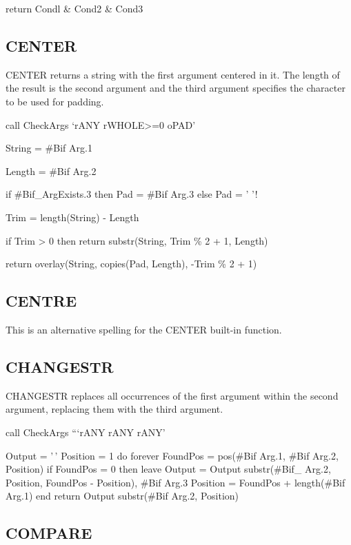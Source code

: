 return Condl \& Cond2 \& Cond3

\hypertarget{center}{%
\subsection{CENTER}\label{center}}

CENTER returns a string with the first argument centered in it. The
length of the result is the second argument and the third argument
specifies the character to be used for padding.

call CheckArgs `rANY rWHOLE\textgreater=0 oPAD'

String = \#Bif Arg.1

Length = \#Bif Arg.2

if \#Bif\_ArgExists.3 then Pad = \#Bif Arg.3 else Pad = ' '!

Trim = length(String) - Length

if Trim \textgreater{} 0 then return substr(String, Trim \% 2 + 1,
Length)

return overlay(String, copies(Pad, Length), -Trim \% 2 + 1)

\hypertarget{centre}{%
\subsection{CENTRE}\label{centre}}

This is an alternative spelling for the CENTER built-in function.

\hypertarget{changestr}{%
\subsection{CHANGESTR}\label{changestr}}

CHANGESTR replaces all occurrences of the first argument within the
second argument, replacing them with the third argument.

call CheckArgs ```rANY rANY rANY'

Output = '\,' Position = 1 do forever FoundPos = pos(\#Bif Arg.1, \#Bif
Arg.2, Position) if FoundPos = 0 then leave Output = Output
\textbar\textbar{} substr(\#Bif\_ Arg.2, Position, FoundPos - Position),
\textbar\textbar{} \#Bif Arg.3 Position = FoundPos + length(\#Bif Arg.1)
end return Output \textbar\textbar{} substr(\#Bif Arg.2, Position)

\hypertarget{compare}{%
\subsection{COMPARE}\label{compare}}

